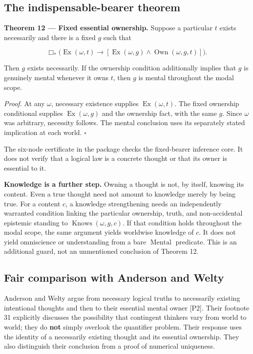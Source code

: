 \documentclass[11pt,a4paper]{article}
\begin{document}
\subsection{The indispensable-bearer
theorem}\label{the-indispensable-bearer-theorem}


\textbf{Theorem 12 --- Fixed essential ownership.} Suppose a particular
\(t\) exists necessarily and there is a fixed \(g\) such that

\nopagebreak[4]

\[
\Box_*\bigl(\operatorname{Ex}(\omega,t)
\to[\operatorname{Ex}(\omega,g)\land\operatorname{Own}(\omega,g,t)]\bigr).
\]

Then \(g\) exists necessarily. If the ownership condition additionally
implies that \(g\) is genuinely mental whenever it owns \(t\), then
\(g\) is mental throughout the modal scope.

\emph{Proof.} At any \(\omega\), necessary existence supplies
\(\operatorname{Ex}(\omega,t)\). The fixed ownership conditional
supplies \(\operatorname{Ex}(\omega,g)\) and the ownership fact, with
the same \(g\). Since \(\omega\) was arbitrary, necessity follows. The
mental conclusion uses its separately stated implication at each world.
\(\square\)

The six-node certificate in the package checks the fixed-bearer
inference core. It does not verify that a logical law is a concrete
thought or that its owner is essential to it.

\textbf{Knowledge is a further step.} Owning a thought is not, by
itself, knowing its content. Even a true thought need not amount to
knowledge merely by being true. For a content \(c\), a knowledge
strengthening needs an independently warranted condition linking the
particular ownership, truth, and non-accidental epistemic standing to
\(\operatorname{Knows}(\omega,g,c)\). If that condition holds throughout
the modal scope, the same argument yields worldwise knowledge of \(c\).
It does not yield omniscience or understanding from a bare
\(\operatorname{Mental}\) predicate. This is an additional guard, not an
unmentioned conclusion of Theorem 12.

\subsection{Fair comparison with Anderson and
Welty}\label{fair-comparison-with-anderson-and-welty}

Anderson and Welty argue from necessary logical truths to necessarily
existing intentional thoughts and then to their essential mental owner
{[}P2{]}. Their footnote 31 explicitly discusses the possibility that
contingent thinkers vary from world to world; they do \textbf{not}
simply overlook the quantifier problem. Their response uses the identity
of a necessarily existing thought and its essential ownership. They also
distinguish their conclusion from a proof of numerical uniqueness.
\end{document}
